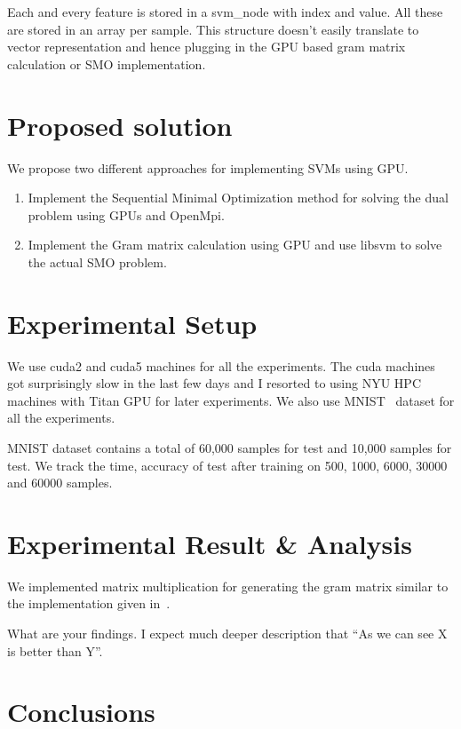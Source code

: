 \documentclass{article}
\begin{document}
Each and every feature is stored in a svm\_node with index and value.
All these are stored in an array per sample.
This structure doesn't easily translate to vector representation and hence plugging in the GPU based gram matrix calculation or SMO implementation.

\section{Proposed solution}
We propose two different approaches for implementing SVMs using GPU\@.

\begin{enumerate}
\item Implement the Sequential Minimal Optimization method for solving the dual problem using GPUs and OpenMpi.
\item Implement the Gram matrix calculation using GPU and use libsvm to solve the actual SMO problem.
\end{enumerate}

\section{Experimental Setup}
We use cuda2 and cuda5 machines for all the experiments.
The cuda machines got surprisingly slow in the last few days and I resorted to using NYU HPC machines with Titan GPU for later experiments.
We also use MNIST~\cite{lecun1998mnist} dataset for all the experiments.

MNIST dataset contains a total of 60,000 samples for test and 10,000 samples for test.
We track the time, accuracy of test after training on 500, 1000, 6000, 30000 and 60000 samples.

\section{Experimental Result \& Analysis}

We implemented matrix multiplication for generating the gram matrix similar to the implementation given in~\cite{matrixmuleg}.


What are your findings. I expect much deeper description that ``As we can see X is better than Y''.

\section{Conclusions}



\end{document}
